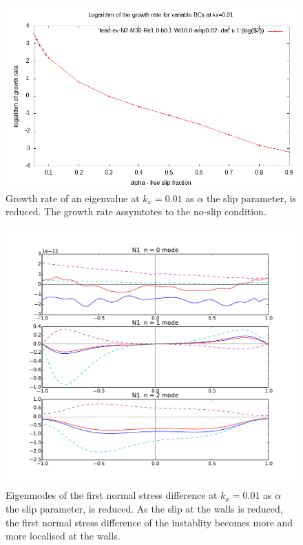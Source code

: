 \documentclass{jfm}
\begin{document}
\begin{figure}
    \centering
    \includegraphics[width=\textwidth]{./figures/evaldiverg_varslip}
    \caption{Growth rate of an eigenvalue at $k_x=0.01$ as $\alpha$ the slip parameter, is reduced. The growth rate assymtotes to the no-slip condition.}
    \label{fig:evaldiverg_varslip}
\end{figure}

\begin{figure}
    \centering
    \includegraphics[width=\textwidth]{./figures/eigenmode_varslip}
    \caption{Eigenmodes of the first normal stress difference at $k_x=0.01$ as $\alpha$ the slip parameter, is reduced. As the slip at the walls is reduced, the first normal stress difference of the instablity becomes more and more localised at the walls.}
    \label{fig:eigenmode_varslip}
\end{figure}
\end{document}
